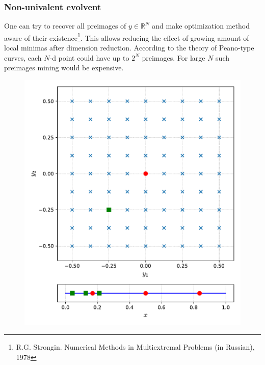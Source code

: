 \documentclass[aspectratio=1610]{beamer}
\begin{document}
\begin{frame}
  \frametitle{Non-univalent evolvent}
    One can try to recover all preimages of \(y\in\mathbb{R}^N\) and make optimization method aware of their existence\footnote{R.G. Strongin. Numerical Methods in Multiextremal Problems (in Russian), 1978}. This allows reducing the effect of growing amount of local minimas after dimension reduction.
    According to the theory of Peano-type curves, each \(N\)-d point could have up to \(2^N\) preimages. For large \(N\) such preimages mining would be expensive.
      \begin{figure}[ht]
        \includegraphics[width=.25\textwidth]{noninjective.pdf}
      \end{figure}
\end{frame}
\end{document}
